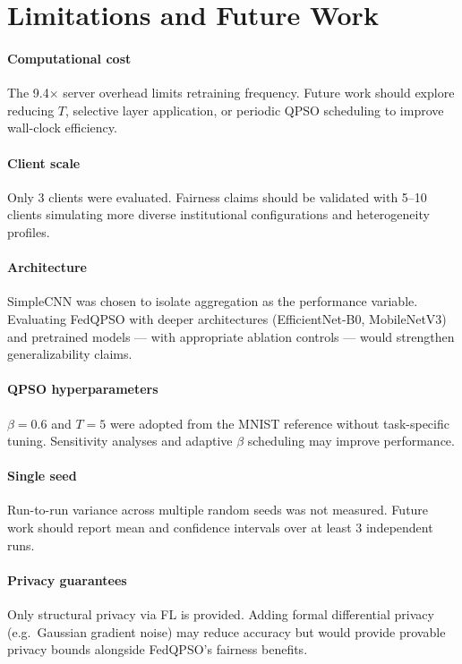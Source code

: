 \documentclass[conference]{IEEEtran}
\begin{document}
\section{Limitations and Future Work}
\label{sec:limitations}

\paragraph{Computational cost}
The 9.4$\times$ server overhead limits retraining frequency. Future work
should explore reducing $T$, selective layer application, or periodic QPSO
scheduling to improve wall-clock efficiency.

\paragraph{Client scale}
Only 3 clients were evaluated. Fairness claims should be validated with 5--10
clients simulating more diverse institutional configurations and heterogeneity
profiles.

\paragraph{Architecture}
SimpleCNN was chosen to isolate aggregation as the performance variable.
Evaluating FedQPSO with deeper architectures (EfficientNet-B0, MobileNetV3)
and pretrained models --- with appropriate ablation controls --- would
strengthen generalizability claims.

\paragraph{QPSO hyperparameters}
$\beta = 0.6$ and $T = 5$ were adopted from the MNIST reference
\cite{edla2025mnist} without task-specific tuning. Sensitivity analyses
and adaptive $\beta$ scheduling may improve performance.

\paragraph{Single seed}
Run-to-run variance across multiple random seeds was not measured. Future
work should report mean and confidence intervals over at least 3 independent
runs.

\paragraph{Privacy guarantees}
Only structural privacy via FL is provided. Adding formal differential
privacy (e.g.\ Gaussian gradient noise) may reduce accuracy but would
provide provable privacy bounds alongside FedQPSO's fairness benefits.
\end{document}

